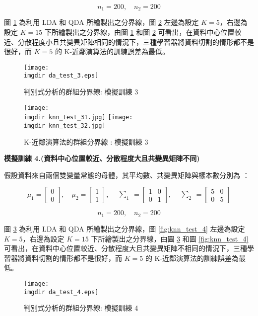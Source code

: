 \[n_1 = 200, \quad n_2 = 200\]

圖 \ref{fig:da_test_3} 為利用 LDA 和 QDA 所繪製出之分界線，圖 \ref{fig:knn_test_3} 左邊為設定 $K =5$，右邊為設定 $K = 15$ 下所繪製出之分界線，由圖 \ref{fig:da_test_3} 和圖 \ref{fig:knn_test_3} 可看出，在資料中心位置較近、分散程度小且共變異矩陣相同的情況下，三種學習器將資料切割的情形都不是很好，而 $K = 5$ 的 K-近鄰演算法的訓練誤差為最低。
\begin{figure}[H]
    \centering
        \texttt{[image: \\imgdir da\_test\_3.eps]}
    \caption{判別式分析的群組分界線: 模擬訓練 3}
    \label{fig:da_test_3}
\end{figure}

\begin{figure}[H]
\centering
\texttt{[image: \\imgdir knn\_test\_31.jpg]}
\texttt{[image: \\imgdir knn\_test\_32.jpg]}
\caption{K-近鄰演算法的群組分界線 : 模擬訓練 3} 
\label{fig:knn_test_3}
\end{figure}

\textbf{\large 模擬訓練 4.(資料中心位置較近、分散程度大且共變異矩陣不同)}

假設資料來自兩個雙變量常態的母體，其平均數、共變異矩陣與樣本數分別為 ：

\[\mu_1 = \begin{bmatrix}
0 \\
0
\end{bmatrix}, \quad \mu_2 = \begin{bmatrix}
1 \\
1
\end{bmatrix}, \quad \begin{matrix} \sum_{1} \end{matrix} = \begin{bmatrix}
1 & 0\\
0 & 1
\end{bmatrix}, \quad \begin{matrix} \sum_{2} \end{matrix} = \begin{bmatrix}
5 & 0\\
0 & 5
\end{bmatrix}\]

\[n_1 = 200, \quad n_2 = 200\]

圖 \ref{fig:da_test_4} 為利用 LDA 和 QDA 所繪製出之分界線，圖 \ref{fig:knn_test_4} 左邊為設定 $K =5$，右邊為設定 $K = 15$ 下所繪製出之分界線，由圖 \ref{fig:da_test_4} 和圖 \ref{fig:knn_test_4} 可看出，在資料中心位置較近、分散程度大且共變異矩陣不相同的情況下，三種學習器將資料切割的情形都不是很好，而 $K = 5$ 的 K-近鄰演算法的訓練誤差為最低。
\begin{figure}[H]
    \centering
        \texttt{[image: \\imgdir da\_test\_4.eps]}
    \caption{判別式分析的群組分界線: 模擬訓練 4}
    \label{fig:da_test_4}
\end{figure}

